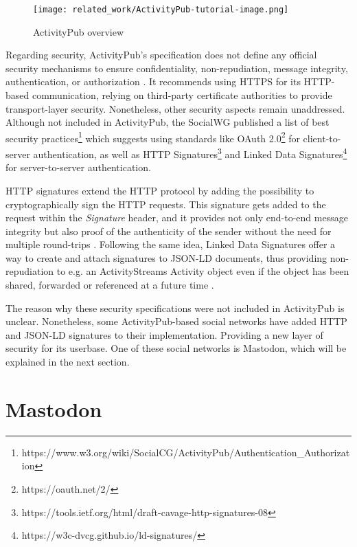 \begin{figure}[H]
  \centering
  \texttt{[image: related\_work/ActivityPub-tutorial-image.png]}
  \caption{ActivityPub overview \cite{lemmer-webber_tallon_guy_prodromou_2018}}
  \label{fig:ap_flow}
\end{figure}

Regarding security, ActivityPub's specification does not define any official security mechanisms to ensure confidentiality, non-repudiation, message integrity, authentication, or authorization \cite{lemmer-webber_tallon_guy_prodromou_2018}. It recommends using HTTPS for its HTTP-based communication, relying on third-party certificate authorities to provide transport-layer security. Nonetheless, other security aspects remain unaddressed. Although not included in ActivityPub, the SocialWG published a list of best security practices\footnote{https://www.w3.org/wiki/SocialCG/ActivityPub/Authentication\_Authorization} which suggests using standards like OAuth 2.0\footnote{https://oauth.net/2/} for client-to-server authentication, as well as HTTP Signatures\footnote{https://tools.ietf.org/html/draft-cavage-http-signatures-08} and Linked Data Signatures\footnote{https://w3c-dvcg.github.io/ld-signatures/} for server-to-server authentication.

HTTP signatures extend the HTTP protocol by adding the possibility to cryptographically sign the HTTP requests. This signature gets added to the request within the \emph{Signature} header, and it provides not only end-to-end message integrity but also proof of the authenticity of the sender without the need for multiple round-trips \cite{cavage_sporny_2019}. Following the same idea, Linked Data Signatures offer a way to create and attach signatures to JSON-LD documents, thus providing non-repudiation to e.g. an ActivityStreams Activity object even if the object has been shared, forwarded or referenced at a future time \cite{celik_prodromou_le_hors_2014}.

The reason why these security specifications were not included in ActivityPub is unclear. Nonetheless, some ActivityPub-based social networks have added HTTP and JSON-LD signatures to their implementation. Providing a new layer of security for its userbase. One of these social networks is Mastodon, which will be explained in the next section.


\section{Mastodon}\label{section:mastodon}

